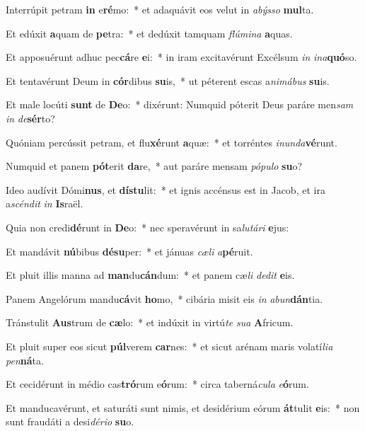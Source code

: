 \item Interrúpit petram \textbf{in} e\textbf{ré}mo:~* et adaquávit eos velut in \textit{a}\textit{býs}\textit{so} \textbf{mul}ta.
\item Et edúxit \textbf{a}quam de \textbf{pe}tra:~* et dedúxit tamquam \textit{flú}\textit{mi}\textit{na} \textbf{a}quas.
\item Et apposuérunt adhuc pec\textbf{cá}re \textbf{e}i:~* in iram excitavérunt Excélsum \textit{in} \textit{in}\textit{a}\textbf{quó}so.
\item Et tentavérunt Deum in \textbf{cór}dibus \textbf{su}is,~* ut péterent escas a\textit{ni}\textit{má}\textit{bus} \textbf{su}is.
\item Et male locúti \textbf{sunt} de \textbf{De}o:~* dixérunt: Numquid póterit Deus paráre men\textit{sam} \textit{in} \textit{de}\textbf{sér}to?
\item Quóniam percússit petram, et flu\textbf{xé}runt \textbf{a}quæ:~* et torréntes \textit{in}\textit{un}\textit{da}\textbf{vé}runt.
\item Numquid et panem \textbf{pót}erit \textbf{da}re,~* aut paráre mensam \textit{pó}\textit{pu}\textit{lo} \textbf{su}o?
\item Ideo audívit Dómi\textbf{nus}, et \textbf{dís}\textbf{tu}lit:~* et ignis accénsus est in Jacob, et ira a\textit{scén}\textit{dit} \textit{in} \textbf{Is}raël.
\item Quia non credi\textbf{dé}runt in \textbf{De}o:~* nec speravérunt in sa\textit{lu}\textit{tá}\textit{ri} \textbf{e}jus:
\item Et mandávit \textbf{nú}bibus \textbf{dé}\textbf{su}per:~* et jánuas \textit{cæ}\textit{li} \textit{a}\textbf{pé}ruit.
\item Et pluit illis manna ad \textbf{man}du\textbf{cán}dum:~* et panem cæ\textit{li} \textit{de}\textit{dit} \textbf{e}is.
\item Panem Angelórum mandu\textbf{cá}vit \textbf{ho}mo,~* cibária misit eis \textit{in} \textit{ab}\textit{un}\textbf{dán}tia.
\item Tránstulit \textbf{Aus}trum de \textbf{cæ}lo:~* et indúxit in virtú\textit{te} \textit{su}\textit{a} \textbf{A}fricum.
\item Et pluit super eos sicut \textbf{púl}verem \textbf{car}nes:~* et sicut arénam maris volatí\textit{li}\textit{a} \textit{pen}\textbf{ná}ta.
\item Et cecidérunt in médio cas\textbf{tró}rum e\textbf{ó}rum:~* circa taberná\textit{cu}\textit{la} \textit{e}\textbf{ó}rum.
\item Et manducavérunt, et saturáti sunt nimis, et desidérium eórum \textbf{át}tulit \textbf{e}is:~* non sunt fraudáti a desi\textit{dé}\textit{ri}\textit{o} \textbf{su}o.
